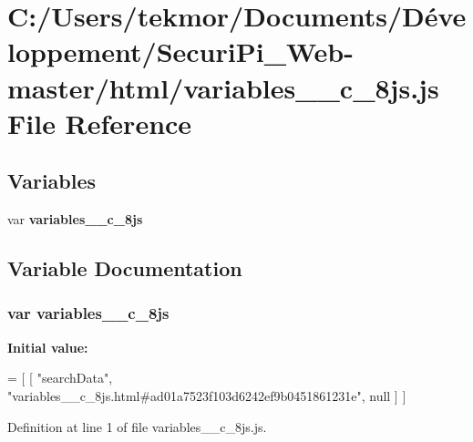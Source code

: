 \section{C\+:/\+Users/tekmor/\+Documents/\+Développement/\+Securi\+Pi\+\_\+\+Web-\/master/html/variables\+\_\+\+\_\+c\+\_\+8js.js File Reference}
\label{variables____c__8js_8js}
\subsection*{Variables}
\begin{DoxyCompactItemize}
\item 
var {\bf variables\+\_\+\+\_\+c\+\_\+8js}
\end{DoxyCompactItemize}


\subsection{Variable Documentation}
\subsubsection[{variables\+\_\+\+\_\+c\+\_\+8js}]{\setlength{\rightskip}{0pt plus 5cm}var variables\+\_\+\+\_\+c\+\_\+8js}\label{variables____c__8js_8js_aa8362333773566f8c5ea9a4b9cc8030b}
{\bfseries Initial value\+:}
\begin{DoxyCode}
=
[
    [ \textcolor{stringliteral}{"searchData"}, \textcolor{stringliteral}{"variables\_\_c\_8js.html#ad01a7523f103d6242ef9b0451861231e"}, null ]
]
\end{DoxyCode}


Definition at line 1 of file variables\+\_\+\+\_\+c\+\_\+8js.\+js.

